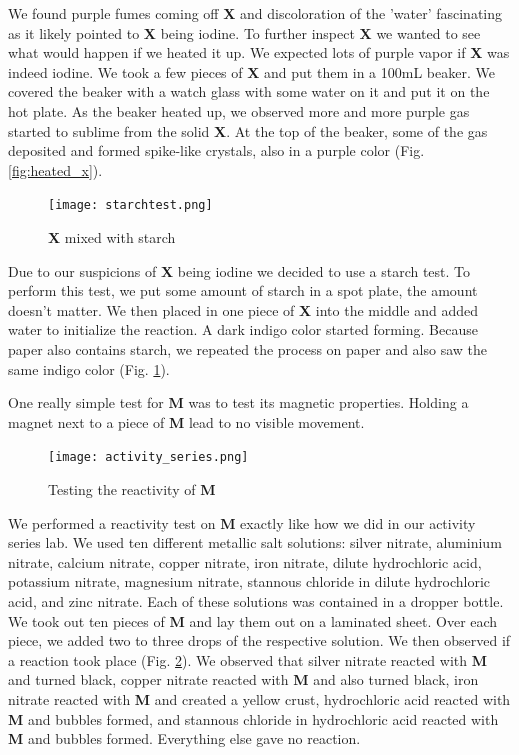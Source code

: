 \documentclass[titlepage]{article}
\begin{document}
We found purple fumes coming off \textbf{X} and discoloration of the 'water' fascinating as it likely pointed to \textbf{X} being iodine. To further inspect \textbf{X} we wanted to see what would happen if we heated it up. We expected lots of purple vapor if \textbf{X} was indeed iodine. We took a few pieces of \textbf{X} and put them in a 100\unit{\milli\liter} beaker. We covered the beaker with a watch glass with some water on it and put it on the hot plate. As the beaker heated up, we observed more and more purple gas started to sublime from the solid \textbf{X}. At the top of the beaker, some of the gas deposited and formed spike-like crystals, also in a purple color (Fig. \ref{fig:heated_x}).

\begin{figure}[h]
    \centering
    \texttt{[image: starchtest.png]}
    \caption{\textbf{X} mixed with starch}
    \label{fig:starch}
\end{figure}

Due to our suspicions of \textbf{X} being iodine we decided to use a starch test. To perform this test, we put some amount of starch in a spot plate, the amount doesn't matter. We then placed in one piece of \textbf{X} into the middle and added water to initialize the reaction. A dark indigo color started forming. Because paper also contains starch, we repeated the process on paper and also saw the same indigo color (Fig. \ref{fig:starch}).

\bigskip
One really simple test for \textbf{M} was to test its magnetic properties. Holding a magnet next to a piece of \textbf{M} lead to no visible movement.


\begin{figure}[h]
    \centering
    \texttt{[image: activity\_series.png]} 
    \caption{Testing the reactivity of \textbf{M}}
    \label{fig:act_series}
\end{figure}

We performed a reactivity test on \textbf{M} exactly like how we did in our activity series lab. We used ten different metallic salt solutions: silver nitrate, aluminium nitrate, calcium nitrate, copper nitrate, iron nitrate, dilute hydrochloric acid, potassium nitrate, magnesium nitrate, stannous chloride in dilute hydrochloric acid, and zinc nitrate. Each of these solutions was contained in a dropper bottle. We took out ten pieces of \textbf{M} and lay them out on a laminated sheet. Over each piece, we added two to three drops of the respective solution. We then observed if a reaction took place (Fig. \ref{fig:act_series}). We observed that silver nitrate reacted with \textbf{M} and turned black, copper nitrate reacted with \textbf{M} and also turned black, iron nitrate reacted with \textbf{M} and created a yellow crust, hydrochloric acid reacted with \textbf{M} and bubbles formed, and stannous chloride in hydrochloric acid reacted with \textbf{M} and bubbles formed. Everything else gave no reaction.
\end{document}
